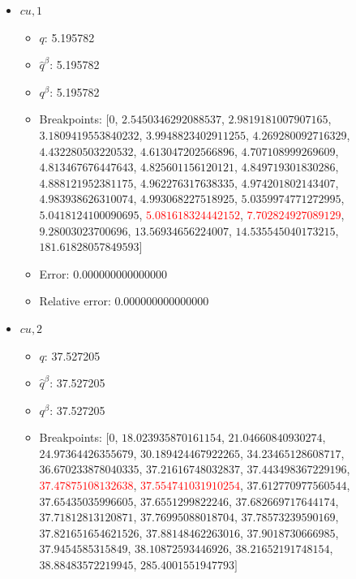 \documentclass{article}%
\begin{document}
\begin{itemize}
\begin{itemize}
		\item $q$: 147.025752%
		\item $\hat{q}^\beta$: 147.025752%
		\item $q^\beta$: 147.025752%
		\item Breakpoints: $[$$0$, $9.898970403313276$, $28.333333333333332$, $42.69900440382105$, $48.67452649027746$, $79.83702775273511$, $87.16107999267206$, $118.88765652962957$, $128.52021081477858$, $131.69760457629607$, $132.12228195956155$, $135.81963163113545$, $137.02923097052596$, $138.86359281280824$, $139.47623233772285$, $140.31685261310218$, $140.7008934199032$, $141.79783607898793$, $142.4338700260237$, $143.30274961189664$, $144.67005099128556$, \textcolor{red}{$144.70843093515643$}, \textcolor{red}{$147.07009017600456$}, $147.48374761404892$, $149.84689443310864$, $720.0$$]$%
		\item Error: 0.000000000000000%
		\item Relative error: 0.000000000000000%
	\end{itemize}%
	\item $\textit{cu},1$%
	\begin{itemize}%
		\item $q$: 5.195782%
		\item $\hat{q}^\beta$: 5.195782%
		\item $q^\beta$: 5.195782%
		\item Breakpoints: $[$$0$, $2.5450346292088537$, $2.9819181007907165$, $3.1809419553840232$, $3.9948823402911255$, $4.269280092716329$, $4.432280503220532$, $4.613047202566896$, $4.707108999269609$, $4.813467676447643$, $4.825601156120121$, $4.849719301830286$, $4.888121952381175$, $4.962276317638335$, $4.974201802143407$, $4.983938626310074$, $4.993068227518925$, $5.0359974771272995$, $5.0418124100090695$, \textcolor{red}{$5.081618324442152$}, \textcolor{red}{$7.702824927089129$}, $9.28003023700696$, $13.56934656224007$, $14.535545040173215$, $181.61828057849593$$]$%
		\item Error: 0.000000000000000%
		\item Relative error: 0.000000000000000%
	\end{itemize}%
	\item $\textit{cu},2$%
	\begin{itemize}%
		\item $q$: 37.527205%
		\item $\hat{q}^\beta$: 37.527205%
		\item $q^\beta$: 37.527205%
		\item Breakpoints: $[$$0$, $18.023935870161154$, $21.04660840930274$, $24.97364426355679$, $30.189424467922265$, $34.23465128608717$, $36.670233878040335$, $37.21616748032837$, $37.443498367229196$, \textcolor{red}{$37.47875108132638$}, \textcolor{red}{$37.554741031910254$}, $37.612770977560544$, $37.65435035996605$, $37.6551299822246$, $37.682669717644174$, $37.71812813120871$, $37.76995088018704$, $37.78573239590169$, $37.821651654621526$, $37.88148462263016$, $37.9018730666985$, $37.9454585315849$, $38.10872593446926$, $38.21652191748154$, $38.88483572219945$, $285.4001551947793$$]$%

\end{itemize}
\end{itemize}
\end{document}
